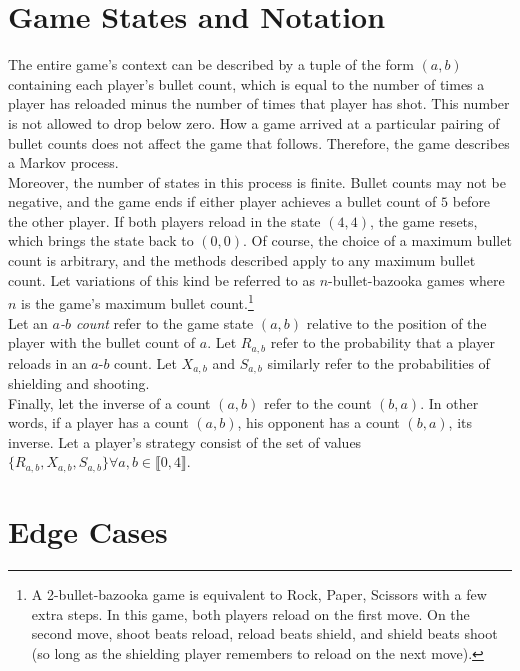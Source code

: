 \documentclass[11pt]{article}
\begin{document}
\begin{multicols}{2}
\section{Game States and Notation}

The entire game's context can be described by a tuple of the form $(a, b)$ containing each player's bullet count, which is equal to the number of times a player has reloaded minus the number of times that player has shot. This number is not allowed to drop below zero. How a game arrived at a particular pairing of bullet counts does not affect the game that follows. Therefore, the game describes a Markov process.
\\

Moreover, the number of states in this process is finite. Bullet counts may not be negative, and the game ends if either player achieves a bullet count of $5$ before the other player. If both players reload in the state $(4, 4)$, the game resets, which brings the state back to $(0, 0)$. Of course, the choice of a maximum bullet count is arbitrary, and the methods described apply to any maximum bullet count. Let variations of this kind be referred to as $n$-bullet-bazooka games where $n$ is the game's maximum bullet count.\footnote{A 2-bullet-bazooka game is equivalent to Rock, Paper, Scissors with a few extra steps. In this game, both players reload on the first move. On the second move, shoot beats reload, reload beats shield, and shield beats shoot (so long as the shielding player remembers to reload on the next move).}
\\

Let an \emph{$a$-$b$ count} refer to the game state $(a, b)$ relative to the position of the player with the bullet count of $a$. Let $R_{a,b}$ refer to the probability that a player reloads in an $a$-$b$ count. Let $X_{a,b}$ and $S_{a,b}$ similarly refer to the probabilities of shielding and shooting.
\\

Finally, let the inverse of a count $(a, b)$ refer to the count $(b, a)$. In other words, if a player has a count $(a, b)$, his opponent has a count $(b, a)$, its inverse. Let a player's strategy consist of the set of values $\{R_{a,b}, X_{a,b}, S_{a,b}\} \forall a, b \in  \llbracket 0, 4 \rrbracket$. 
\\

\section{Edge Cases}


\end{multicols}
\end{document}
